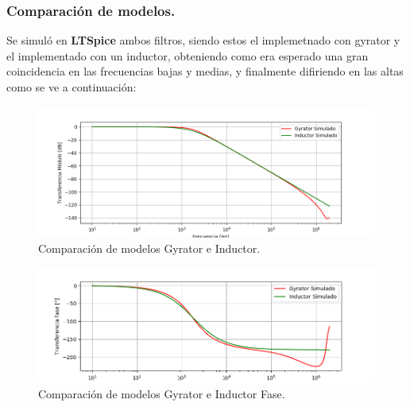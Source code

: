 \documentclass[a4paper]{article}
\begin{document}
\subsubsection{Comparación de modelos.}
Se simuló en \textbf{LTSpice} ambos filtros, siendo estos el implemetnado con gyrator y el implementado con un inductor, obteniendo como era esperado una gran coincidencia en las frecuencias bajas y medias, y finalmente difiriendo en las altas como se ve a continuación:
\begin{figure}[H]	
	\centering
	\includegraphics[width=\textwidth]{ImagenesEj2/simLP.PNG}
	\caption{Comparación de modelos Gyrator e Inductor.}
	\label{fig:gyrIndL}
\end{figure}
\begin{figure}[H]	
	\centering
	\includegraphics[width=\textwidth]{ImagenesEj2/simLPP.PNG}
	\caption{Comparación de modelos Gyrator e Inductor Fase.}
	\label{fig:gyrIndPL}
\end{figure}
\end{document}

